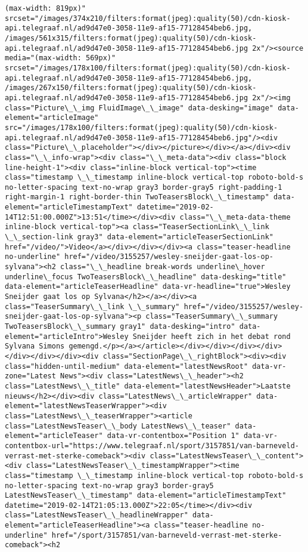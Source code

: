 \documentclass[11pt]{article}
\begin{document}
\begin{Verbatim}[commandchars=\\\{\}]
(max-width: 819px)" srcset="/images/374x210/filters:format(jpeg):quality(50)/cdn-kiosk-api.telegraaf.nl/ad9d47e0-3058-11e9-af15-77128454beb6.jpg, /images/561x315/filters:format(jpeg):quality(50)/cdn-kiosk-api.telegraaf.nl/ad9d47e0-3058-11e9-af15-77128454beb6.jpg 2x"/><source media="(max-width: 569px)" srcset="/images/178x100/filters:format(jpeg):quality(50)/cdn-kiosk-api.telegraaf.nl/ad9d47e0-3058-11e9-af15-77128454beb6.jpg, /images/267x150/filters:format(jpeg):quality(50)/cdn-kiosk-api.telegraaf.nl/ad9d47e0-3058-11e9-af15-77128454beb6.jpg 2x"/><img class="Picture\_\_img FluidImage\_\_image" data-desking="image" data-element="articleImage" src="/images/178x100/filters:format(jpeg):quality(50)/cdn-kiosk-api.telegraaf.nl/ad9d47e0-3058-11e9-af15-77128454beb6.jpg"/><div class="Picture\_\_placeholder"></div></picture></div></a></div><div class="\_\_info-wrap"><div class="\_\_meta-data"><div class="block line-height-1"><div class="inline-block vertical-top"><time class="timestamp \_\_timestamp inline-block vertical-top roboto-bold-s no-letter-spacing text-no-wrap gray3 border-gray5 right-padding-1 right-margin-1 right-border-thin TwoTeasersBlock\_\_timestamp" data-element="articleTimestampText" datetime="2019-02-14T12:51:00.000Z">13:51</time></div><div class="\_\_meta-data-theme inline-block vertical-top"><a class="TeaserSectionLink\_\_link \_\_section-link gray3" data-element="articleTeaserSectionLink" href="/video/">Video</a></div></div></div><a class="teaser-headline no-underline" href="/video/3155257/wesley-sneijder-gaat-los-op-sylvana"><h2 class="\_\_headline break-words underline\_hover underline\_focus TwoTeasersBlock\_\_headline" data-desking="title" data-element="articleTeaserHeadline" data-vr-headline="true">Wesley Sneijder gaat los op Sylvana</h2></a></div><a class="TeaserSummary\_\_link \_\_summary" href="/video/3155257/wesley-sneijder-gaat-los-op-sylvana"><p class="TeaserSummary\_\_summary TwoTeasersBlock\_\_summary gray1" data-desking="intro" data-element="articleIntro">Wesley Sneijder heeft zich in het debat rond Sylvana Simons gemengd.</p></a></article></div></div></div></div></div></div></div><div class="SectionPage\_\_rightBlock"><div><div class="hidden-until-medium" data-element="latestNewsRoot" data-vr-zone="Latest News"><div class="LatestNews\_\_header"><h2 class="LatestNews\_\_title" data-element="latestNewsHeader">Laatste nieuws</h2></div><div class="LatestNews\_\_articleWrapper" data-element="latestNewsTeaserWrapper"><div class="LatestNews\_\_teaserWrapper"><article class="LatestNewsTeaser\_\_body LatestNews\_\_teaser" data-element="articleTeaser" data-vr-contentbox="Position 1" data-vr-contentbox-url="https://www.telegraaf.nl/sport/3157851/van-barneveld-verrast-met-sterke-comeback"><div class="LatestNewsTeaser\_\_content"><div class="LatestNewsTeaser\_\_timestampWrapper"><time class="timestamp \_\_timestamp inline-block vertical-top roboto-bold-s no-letter-spacing text-no-wrap gray3 border-gray5 LatestNewsTeaser\_\_timestamp" data-element="articleTimestampText" datetime="2019-02-14T21:05:13.000Z">22:05</time></div><div class="LatestNewsTeaser\_\_headlineWrapper" data-element="articleTeaserHeadline"><a class="teaser-headline no-underline" href="/sport/3157851/van-barneveld-verrast-met-sterke-comeback"><h2 
\end{Verbatim}
\end{document}
